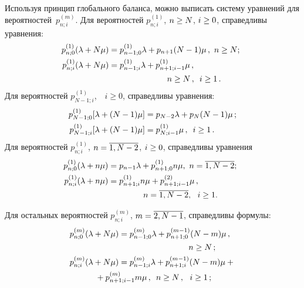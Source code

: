\begin{multicols}{2}
Используя принцип глобального баланса, можно выписать систему уравнений для
вероятностей~$p^{(m)}_{n;i}$.
Для вероятностей $p^{(1)}_{n;i}$, $n\hm\ge N$,
$i \hm\ge 0$, справедливы уравнения:
\begin{align}
\hspace*{-2.8mm}p^{(1)}_{n;0} (\lambda+N\mu) &= p^{(1)}_{n-1;0} \lambda +
p_{n+1} (N-1) \mu \,,\ n\ge N;
\!\!\label{eq-1-1}
\\
\hspace*{-2.8mm}p^{(1)}_{n;i} (\lambda+N\mu) &= p^{(1)}_{n-1;i} \lambda +
p^{(1)}_{n+1;i-1} \mu \,,\notag\\
&\hspace*{25mm} n\ge N\,,\enskip i \ge 1\,.
\label{eq-1-2}\!\!
\end{align}
Для вероятностей $p^{(1)}_{N-1;i}$,\ \ $i \ge 0$,
справедливы уравнения:
\begin{align}
\label{eq-1-3}
p^{(1)}_{N-1;0} [\lambda+(N-1)\mu] &=
p_{N-2} \lambda + p_{N} (N-1)\mu\,;
\\
\label{eq-1-4}
p^{(1)}_{N-1;i} [\lambda+(N-1)\mu] &= p^{(1)}_{N;i-1} \mu\,,\enskip i \ge 1\,.
\end{align}
Для вероятностей
$p^{(1)}_{n;i}$, $n\hm=\overline{1,N-2}$, $i \hm\ge 0$,
справедливы уравнения
\begin{align}
\label{eq-1-5}
\hspace*{-2mm}p^{(1)}_{n;0} (\lambda+n\mu) &= p_{n-1} \lambda +
p^{(1)}_{n+1;0} n\mu ,\  n=\overline{1,N-2};
\\
\label{eq-1-6}
\hspace*{-2mm}p^{(1)}_{n;i} (\lambda+n\mu) &= p^{(1)}_{n+1;i} n\mu
+ p^{(2)}_{n+1;i-1} \mu \,,\notag\\
&\hspace*{15mm}n=\overline{1,N-2},\ \ i \ge 1.
\end{align}


Для остальных вероятностей
$p^{(m)}_{n;i}$, $m\hm=\overline{2,N-1}$, справедливы формулы:
\begin{align}
p^{(m)}_{n;0} (\lambda+N\mu) &= p^{(m)}_{n-1;0} \lambda +
p^{(m-1)}_{n+1;0} (N-m) \mu\,,\notag\\
& \hspace*{30mm}n\ge N\,; \label{bat-1}
\\
p^{(m)}_{n;i} (\lambda+N\mu) &= p^{(m)}_{n-1;i} \lambda +
p^{(m-1)}_{n+1;i} (N-m) \mu +{}\notag\\
&\hspace*{-10mm}{}+p^{(m)}_{n+1;i-1} m \mu \,,\enskip
n\ge N\,,\ \ i\ge 1\,;
\label{bat-2}
\end{align}


\end{multicols}
